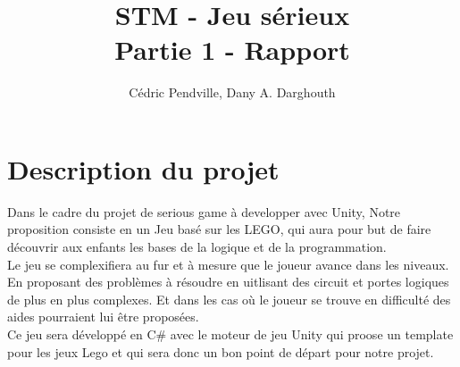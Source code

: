 \documentclass{article}
\title{\textbf{STM - Jeu sérieux\\Partie 1 - Rapport}}
\author{Cédric Pendville, Dany A. Darghouth}
\date{}
\begin{document}
\maketitle


\section{Description du projet}
Dans le cadre du projet de serious game à developper avec Unity, Notre proposition consiste en un Jeu basé sur les LEGO, qui aura pour but de faire découvrir aux enfants les bases de la logique et de la programmation.\\ 

Le jeu se complexifiera au fur et à mesure que le joueur avance dans les niveaux. En proposant des problèmes à résoudre en uitlisant des circuit et portes logiques de plus en plus complexes. Et dans les cas où le joueur se trouve en difficulté des aides pourraient lui être proposées.\\

Ce jeu sera développé en C\# avec le moteur de jeu Unity qui proose un template pour les jeux Lego et qui sera donc un bon point de départ pour notre projet.\\
\end{document}

